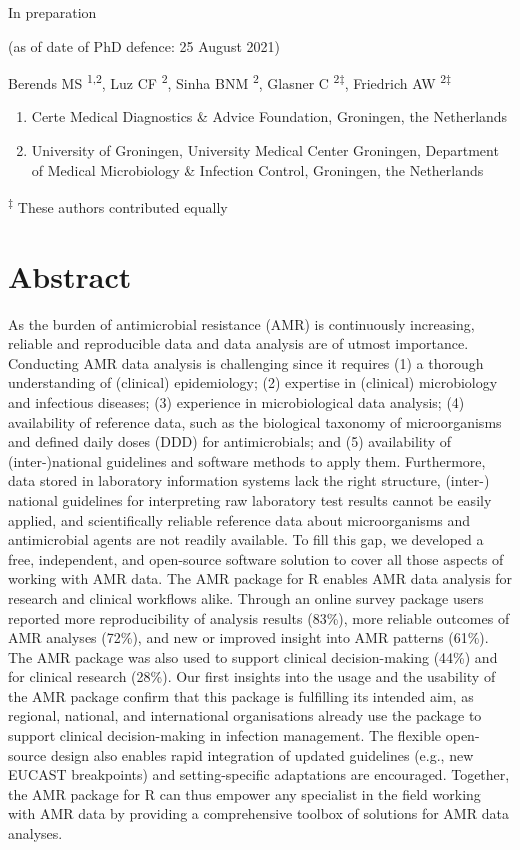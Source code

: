 \documentclass[
]{book}
\providecommand{\tightlist}{%
  \setlength{\itemsep}{0pt}\setlength{\parskip}{0pt}}
\begin{document}
In preparation

(as of date of PhD defence: 25 August 2021)

Berends MS \textsuperscript{1,2}, Luz CF \textsuperscript{2}, Sinha BNM \textsuperscript{2}, Glasner C \textsuperscript{2‡}, Friedrich AW \textsuperscript{2‡}

\begin{enumerate}
\def\labelenumi{\arabic{enumi}.}
\tightlist
\item
  Certe Medical Diagnostics \& Advice Foundation, Groningen, the Netherlands
\item
  University of Groningen, University Medical Center Groningen, Department of Medical Microbiology \& Infection Control, Groningen, the Netherlands
\end{enumerate}

\textsuperscript{‡} These authors contributed equally

\hypertarget{abstract-1}{%
\section*{Abstract}\label{abstract-1}}

As the burden of antimicrobial resistance (AMR) is continuously increasing, reliable and reproducible data and data analysis are of utmost importance. Conducting AMR data analysis is challenging since it requires (1) a thorough understanding of (clinical) epidemiology; (2) expertise in (clinical) microbiology and infectious diseases; (3) experience in microbiological data analysis; (4) availability of reference data, such as the biological taxonomy of microorganisms and defined daily doses (DDD) for antimicrobials; and (5) availability of (inter-)national guidelines and software methods to apply them. Furthermore, data stored in laboratory information systems lack the right structure, (inter-) national guidelines for interpreting raw laboratory test results cannot be easily applied, and scientifically reliable reference data about microorganisms and antimicrobial agents are not readily available. To fill this gap, we developed a free, independent, and open-source software solution to cover all those aspects of working with AMR data. The AMR package for R enables AMR data analysis for research and clinical workflows alike. Through an online survey package users reported more reproducibility of analysis results (83\%), more reliable outcomes of AMR analyses (72\%), and new or improved insight into AMR patterns (61\%). The AMR package was also used to support clinical decision-making (44\%) and for clinical research (28\%). Our first insights into the usage and the usability of the AMR package confirm that this package is fulfilling its intended aim, as regional, national, and international organisations already use the package to support clinical decision-making in infection management. The flexible open-source design also enables rapid integration of updated guidelines (e.g., new EUCAST breakpoints) and setting-specific adaptations are encouraged. Together, the AMR package for R can thus empower any specialist in the field working with AMR data by providing a comprehensive toolbox of solutions for AMR data analyses.
\end{document}
